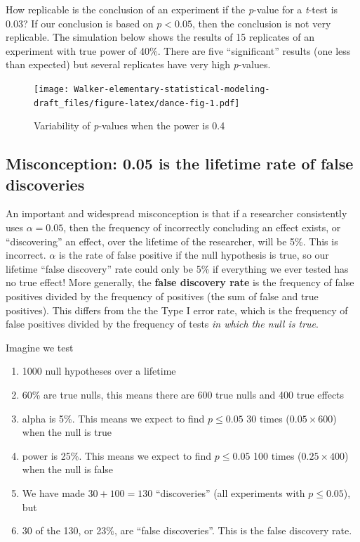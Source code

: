 \documentclass[]{book}
\providecommand{\tightlist}{%
  \setlength{\itemsep}{0pt}\setlength{\parskip}{0pt}}
\begin{document}
How replicable is the conclusion of an experiment if the \emph{p}-value for a \emph{t}-test is 0.03? If our conclusion is based on \(p < 0.05\), then the conclusion is not very replicable. The simulation below shows the results of 15 replicates of an experiment with true power of 40\%. There are five ``significant'' results (one less than expected) but several replicates have very high \emph{p}-values.

\begin{figure}
\centering
\texttt{[image: Walker-elementary-statistical-modeling-draft\_files/figure-latex/dance-fig-1.pdf]}
\caption{\label{fig:dance-fig}Variability of \emph{p}-values when the power is 0.4}
\end{figure}

\hypertarget{misconception-0.05-is-the-lifetime-rate-of-false-discoveries}{%
\subsection{Misconception: 0.05 is the lifetime rate of false discoveries}\label{misconception-0.05-is-the-lifetime-rate-of-false-discoveries}}

An important and widespread misconception is that if a researcher consistently uses \(\alpha=0.05\), then the frequency of incorrectly concluding an effect exists, or ``discovering'' an effect, over the lifetime of the researcher, will be 5\%. This is incorrect. \(\alpha\) is the rate of false positive if the null hypothesis is true, so our lifetime ``false discovery'' rate could only be 5\% if everything we ever tested has no true effect! More generally, the \textbf{false discovery rate} is the frequency of false positives divided by the frequency of positives (the sum of false and true positives). This differs from the the Type I error rate, which is the frequency of false positives divided by the frequency of tests \emph{in which the null is true}.

Imagine we test

\begin{enumerate}
\def\labelenumi{\arabic{enumi}.}
\tightlist
\item
  1000 null hypotheses over a lifetime
\item
  60\% are true nulls, this means there are 600 true nulls and 400 true effects
\item
  alpha is 5\%. This means we expect to find \(p \le 0.05\) 30 times (\(0.05 \times 600\)) when the null is true
\item
  power is 25\%. This means we expect to find \(p \le 0.05\) 100 times (\(0.25 \times 400\)) when the null is false
\item
  We have made \(30 + 100=130\) ``discoveries'' (all experiments with \(p \le 0.05\)), but
\item
  30 of the 130, or 23\%, are ``false discoveries''. This is the false discovery rate.
\end{enumerate}
\end{document}
